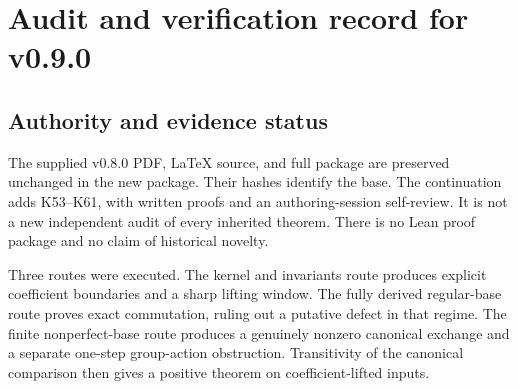 \clearpage
\section{Audit and verification record for v0.9.0}\label{app:audit-v090}

\subsection{Authority and evidence status}
The supplied v0.8.0 PDF, LaTeX source, and full package are preserved unchanged in the new package. Their hashes identify the base. The continuation adds K53--K61, with written proofs and an authoring-session self-review. It is not a new independent audit of every inherited theorem. There is no Lean proof package and no claim of historical novelty.

Three routes were executed. The kernel and invariants route produces explicit coefficient boundaries and a sharp lifting window. The fully derived regular-base route proves exact commutation, ruling out a putative defect in that regime. The finite nonperfect-base route produces a genuinely nonzero canonical exchange and a separate one-step group-action obstruction. Transitivity of the canonical comparison then gives a positive theorem on coefficient-lifted inputs.

